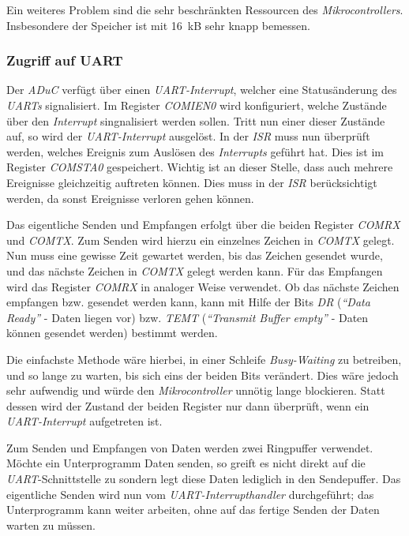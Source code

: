 Ein weiteres Problem sind die sehr beschränkten Ressourcen des \emph{Mikrocontrollers}. Insbesondere der Speicher ist
mit 16~kB sehr knapp bemessen. 


\subsubsection{Zugriff auf UART}
Der \emph{ADuC} verfügt über einen \emph{UART-Interrupt}, welcher eine Statusänderung des \emph{UARTs} signalisiert. 
Im Register \emph{COMIEN0} wird konfiguriert, welche Zustände über den \emph{Interrupt} singnalisiert werden sollen. Tritt
nun einer dieser Zustände auf, so wird der \emph{UART-Interrupt} ausgelöst. In der \emph{ISR} muss nun überprüft
werden, welches Ereignis zum Auslösen des \emph{Interrupts} geführt hat. Dies ist im Register \emph{COMSTA0} 
gespeichert. Wichtig ist an dieser Stelle, dass auch mehrere Ereignisse gleichzeitig auftreten können. 
Dies muss in der \emph{ISR} berücksichtigt werden, da sonst Ereignisse verloren gehen können.

Das eigentliche Senden und Empfangen erfolgt über die beiden Register \emph{COMRX} und \emph{COMTX}.
Zum Senden wird hierzu ein einzelnes Zeichen in \emph{COMTX} gelegt. Nun muss eine gewisse Zeit gewartet
werden, bis das Zeichen gesendet wurde, und das nächste Zeichen in \emph{COMTX} gelegt werden kann.
Für das Empfangen wird das Register \emph{COMRX} in analoger Weise verwendet. Ob das nächste
Zeichen empfangen bzw. gesendet werden kann, kann mit Hilfe der Bits \emph{DR} (\emph{"`Data Ready"'} - Daten liegen vor)
bzw. \emph{TEMT} (\emph{"`Transmit Buffer empty"'} - Daten können gesendet werden) bestimmt werden.

Die einfachste Methode wäre hierbei, in einer Schleife \emph{Busy-Waiting} zu betreiben, und so lange zu warten,
bis sich eins der beiden Bits verändert. Dies wäre jedoch sehr aufwendig und würde den \emph{Mikrocontroller}
unnötig lange blockieren. Statt dessen wird der Zustand der beiden Register nur dann überprüft, wenn ein 
\emph{UART-Interrupt} aufgetreten ist.

Zum Senden und Empfangen von Daten werden zwei Ringpuffer verwendet. Möchte ein Unterprogramm Daten senden,
so greift es nicht direkt auf die \emph{UART}-Schnittstelle zu sondern legt diese Daten lediglich in den Sendepuffer.
Das eigentliche Senden wird nun vom \emph{UART-Interrupthandler} durchgeführt; das Unterprogramm kann weiter arbeiten,
ohne auf das fertige Senden der Daten warten zu müssen.

